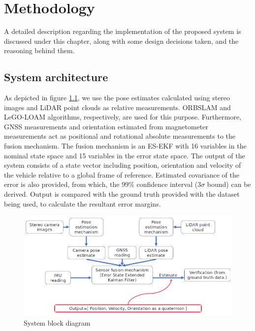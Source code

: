 \chapter{Methodology}
A detailed description regarding the implementation of the proposed system is discussed under this chapter, along with some design decisions taken, and the reasoning behind them.




\section{System architecture}
\label{sec:SystemArchitecture}
As depicted in figure \ref{fig:pa:systemBlockDiagram}, we use the pose estimates calculated using stereo images and \gls{LiDAR} point clouds as relative measurements. \gls{ORBSLAM} and \gls{LeGO-LOAM} algorithms, respectively, are used for this purpose. Furthermore, \gls{GNSS} measurements and orientation estimated from magnetometer measurements act as positional and rotational absolute measurements to the fusion mechanism. The fusion mechanism is an \gls{ES-EKF} with 16 variables in the nominal state space and 15 variables in the error state space. The output of the system consists of a state vector including position, orientation and velocity of the vehicle relative to a global frame of reference. Estimated covariance of the error is also provided, from which, the 99\% confidence interval ($3\sigma$ bound) can be derived. Output is compared with the ground truth provided with the dataset being used, to calculate the resultant error margins.
\begin{figure}[h]
	\begin{center}
	\includegraphics[width=\textwidth]{figs/system-block-diagram.png}
	\end{center}
	\vspace{-0.5cm}
	\caption{System block diagram}
	\label{fig:pa:systemBlockDiagram}
	\vspace{0.5cm}
\end{figure}

